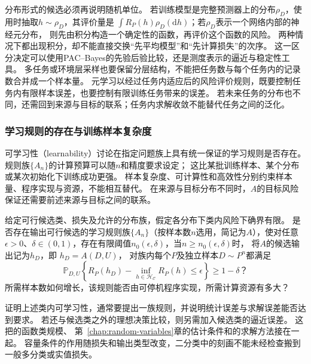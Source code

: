 分布形式的候选必须再说明随机单位。
若训练模型是完整预测器上的分布$\rho_D$，使用时抽取$h\sim\rho_D$，其评价量是
$\int R_P(h)\rho_D(\mathrm dh)$；若$\rho_D$表示一个网络内部的神经元分布，
则先由积分构造一个确定性的函数，再评价这个函数的风险。
两种情况下都出现积分，却不能直接交换“先平均模型”和“先计算损失”的次序。
这一区分决定可以使用PAC--Bayes的先验后验比较，还是测度表示的逼近与稳定性工具。
多任务或环境层采样也要保留分层结构，不能把任务数与每个任务内的记录数合并成一个样本量。
元学习以经过任务内适应后的风险评价规则，既要控制任务内有限样本误差，也要控制有限训练任务带来的误差。
若未来任务的分布也不同，还需回到来源与目标的联系；任务内求解收敛不能替代任务之间的泛化。

\subsubsection{学习规则的存在与训练样本复杂度}
\label{sec:future-analysis-learnability}

可学习性（learnability）讨论在指定问题族上具有统一保证的学习规则是否存在。
规则族$\{A_n\}$的计算预算可以随$n$和精度要求设定；
这比某批训练样本、某个分布或某次初始化下训练成功更强。
样本复杂度、可计算性和高效性分别约束样本量、程序实现与资源，不能相互替代。
在来源与目标分布不同时，$A$的目标风险保证还需要前述来源与目标之间的联系。

\begin{mathproblem}[具有统一保证的学习规则是否存在]
  \label{question:future-learnability}
  给定可行候选类、损失及允许的分布族，假定各分布下类内风险下确界有限。
  是否存在输出可行候选的学习规则族$\{A_n\}$（按样本数$n$选用，简记为$A$），使对任意
  $\epsilon>0$、$\delta\in(0,1)$，存在有限阈值$n_0(\epsilon,\delta)$，当$n\geq n_0(\epsilon,\delta)$时，
  将$A$的候选输出记为$h_D$，即
  $h_D=A(D,U)$，
  对族内每个$P$及独立样本$D\sim P^n$都满足
  \[
    \mathbb P_{D,U}\!\left\{
      R_P(h_D)-\inf_{h\in\mathcal H_{\mathcal C}}R_P(h)
      \leq\epsilon
    \right\}\geq1-\delta\text{？}
  \]
  所需样本数如何增长，该规则能否由可停机程序实现，所需计算资源有多大？
\end{mathproblem}

证明上述类内可学习性，通常要提出一族规则，并说明统计误差与求解误差能否达到要求。
若还与候选类之外的理想决策比较，则另需加入候选类的逼近误差。
这把的函数类规模、
第~\ref{chap:random-variables}章的估计条件和的求解方法接在一起。
容量条件的作用随损失和输出类型改变，二分类中的刻画不能未经检查搬到一般多分类或实值损失。

